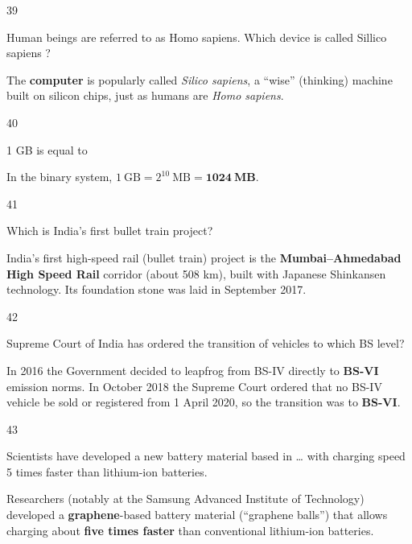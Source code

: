 \begin{question}{39}
{Human beings are referred to as Homo sapiens. Which device is called Sillico sapiens ?\par}
\begin{explain}
The \textbf{computer} is popularly called \emph{Silico sapiens}, a ``wise'' (thinking) machine built on silicon chips, just as humans are \emph{Homo sapiens}.
\end{explain}
\end{question}

\begin{question}{40}
{1 GB is equal to\par}
\begin{explain}
In the binary system, $1\ \text{GB}=2^{10}\ \text{MB}=\mathbf{1024\ MB}$.
\end{explain}
\end{question}

\begin{question}{41}
{Which is India's first bullet train project?\par}
\begin{explain}
India's first high-speed rail (bullet train) project is the \textbf{Mumbai--Ahmedabad High Speed Rail} corridor (about 508 km), built with Japanese Shinkansen technology. Its foundation stone was laid in September 2017.
\end{explain}
\end{question}

\begin{question}{42}
{Supreme Court of India has ordered the transition of vehicles to which BS level?\par}
\begin{explain}
In 2016 the Government decided to leapfrog from BS-IV directly to \textbf{BS-VI} emission norms. In October 2018 the Supreme Court ordered that no BS-IV vehicle be sold or registered from 1 April 2020, so the transition was to \textbf{BS-VI}.
\end{explain}
\end{question}

\begin{question}{43}
{Scientists have developed a new battery material based in \ldots{} with charging speed 5 times faster than lithium-ion batteries.\par}
\begin{explain}
Researchers (notably at the Samsung Advanced Institute of Technology) developed a \textbf{graphene}-based battery material (``graphene balls'') that allows charging about \textbf{five times faster} than conventional lithium-ion batteries.
\end{explain}
\end{question}

